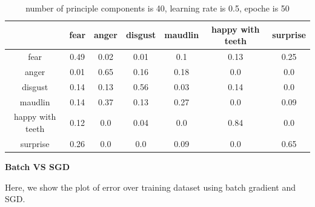 \documentclass{article} %
\begin{document}
\begin{table}[htb]
    \caption{number of principle components is 40, learning rate is 0.5, epoche is 50}
    \begin{center}
    \begin{tabular}{|c|c|c|c|c|c|c|}
    \hline
    & fear & anger & disgust & maudlin & happy with teeth & surprise \\
    \hline
    fear & 0.49 & 0.02 & 0.01 & 0.1 & 0.13 & 0.25\\
    \hline
    anger & 0.01 & 0.65 & 0.16 & 0.18 & 0.0 & 0.0\\
    \hline
    disgust & 0.14 & 0.13 & 0.56 & 0.03 & 0.14 & 0.0\\
    \hline
    maudlin & 0.14 & 0.37 & 0.13 & 0.27 & 0.0 & 0.09\\
    \hline
    happy with teeth & 0.12 & 0.0 & 0.04 & 0.0 & 0.84 & 0.0\\
    \hline
    surprise & 0.26 & 0.0 & 0.0 & 0.09 & 0.0 & 0.65\\
    \hline
    \end{tabular}
    \end{center}
\end{table}

\newpage
\FloatBarrier
\textbf{Batch VS SGD}

Here, we show the plot of error over training dataset using batch gradient and SGD.
\end{document}
